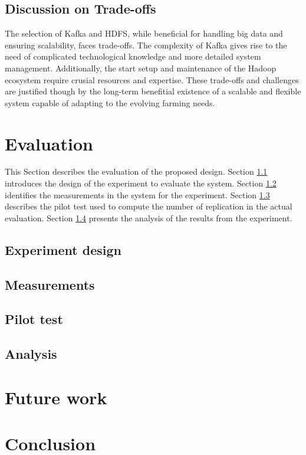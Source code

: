 \documentclass[conference]{IEEEtran}
\begin{document}
\subsection{Discussion on Trade-offs}
The selection of Kafka and HDFS, while beneficial for handling big data and ensuring scalability, faces trade-offs. The complexity of Kafka gives rise to the need of complicated technological knowledge and more detailed system management. Additionally, the start setup and maintenance of the Hadoop ecosystem require crusial resources and expertise. These trade-offs and challenges are justified though by the long-term benefitial existence of a scalable and flexible system capable of adapting to the evolving farming needs.

\section{Evaluation}
\label{sec:evaluation}
This Section describes the evaluation of the proposed design.
Section \ref{sec:design} introduces the design of the experiment to evaluate the system.
Section \ref{sec:measurements} identifies the measurements in the system for the experiment.
Section \ref{sec:pilot_test} describes the pilot test used to compute the number of replication in the actual evaluation.
Section \ref{sec:analysis} presents the analysis of the results from the experiment.


\subsection{Experiment design}
\label{sec:design}


\subsection{Measurements}
\label{sec:measurements}


\subsection{Pilot test}
\label{sec:pilot_test}

\subsection{Analysis}
\label{sec:analysis}


\section{Future work}


\section{Conclusion}




\vspace{12pt}
\end{document}
